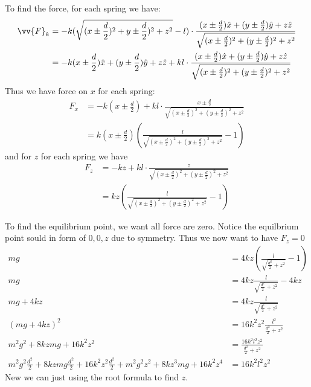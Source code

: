 \documentclass{article}
\begin{document}
\begin{enumerate}
    To find the force, for each spring we have:
    \begin{align*}
        \vv{F}_k &= -k(\sqrt{(x\pm \frac{d}{2})^2 + y\pm \frac{d}{2})^2 + z^2}-l) \cdot \frac{(x\pm \frac{d}{2})\hat{x} + (y\pm \frac{d}{2}) \hat{y} + z\hat{z}}{\sqrt{(x\pm \frac{d}{2})^2 + (y\pm \frac{d}{2})^2 + z^2}} \\
        & = -k(x\pm \frac{d}{2})\hat{x} + (y\pm \frac{d}{2}) \hat{y} + z\hat{z} +kl \cdot \frac{(x\pm \frac{d}{2})\hat{x} + (y\pm \frac{d}{2}) \hat{y} + z\hat{z}}{\sqrt{(x\pm \frac{d}{2})^2 + (y\pm \frac{d}{2})^2 + z^2}}
    \end{align*}
    Thus we have force on $x$ for each spring:
    \begin{align*}
        F_x &= -k(x\pm \frac{d}{2})+kl \cdot \frac{x\pm \frac{d}{2}}{\sqrt{(x\pm \frac{d}{2})^2 + (y\pm \frac{d}{2})^2 + z^2}} \\
        &= k(x\pm \frac{d}{2}) (\frac{l}{\sqrt{(x\pm \frac{d}{2})^2 + (y\pm \frac{d}{2})^2 + z^2}} -1)
    \end{align*}
    and for $z$ for each spring we have
    \begin{align*}
        F_z &= -kz +kl \cdot \frac{z}{\sqrt{(x\pm \frac{d}{2})^2 + (y\pm \frac{d}{2})^2 + z^2}}\\
        &= kz (\frac{l}{\sqrt{(x\pm \frac{d}{2})^2 + (y\pm \frac{d}{2})^2 + z^2}}-1)
    \end{align*}

    To find the equilibrium point, we want all force are zero. Notice the equilbrium point sould in form of $0,0,z$ due to symmetry. Thus we now want to have $F_z = 0$
    \begin{align*}
        mg &= 4kz (\frac{l}{\sqrt{\frac{d^2}{2} + z^2}}-1) \\
        mg &= 4kz \frac{l}{\sqrt{\frac{d^2}{2} + z^2}}-4kz\\
        mg+4kz &= 4kz \frac{l}{\sqrt{\frac{d^2}{2} + z^2}} \\
        (mg+4kz)^2 &= 16k^2z^2 \frac{l^2}{\frac{d^2}{2} + z^2} \\
        m^2g^2+8kzmg+16k^2z^2 &=\frac{16k^2l^2z^2}{\frac{d^2}{2}+z^2} \\
        m^2g^2\frac{d^2}{2}+8kzmg\frac{d^2}{2}+16k^2z^2\frac{d^2}{2} 
        +m^2g^2z^2+8kz^3mg+16k^2z^4 &= 16k^2l^2z^2
    \end{align*}
        New we can just using the root formula to find $z$.


\end{enumerate}
\end{document}
